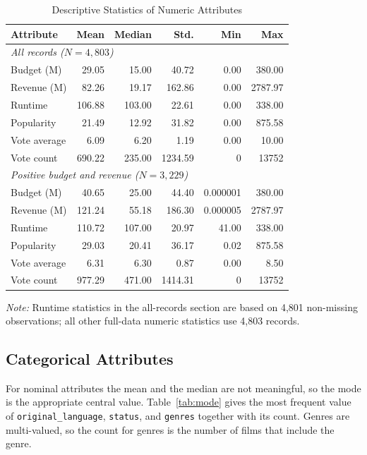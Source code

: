 \documentclass[conference]{IEEEtran}
\begin{document}
\begin{table}[t]
\caption{Descriptive Statistics of Numeric Attributes}
\label{tab:numeric}
\centering
\scriptsize
\setlength{\tabcolsep}{3.2pt}
\begin{tabular}{lrrrrr}
\toprule
Attribute & Mean & Median & Std. & Min & Max \\
\midrule
\multicolumn{6}{l}{\emph{All records ($N=4{,}803$)}}\\
Budget (M) & 29.05 & 15.00 & 40.72 & 0.00 & 380.00 \\
Revenue (M) & 82.26 & 19.17 & 162.86 & 0.00 & 2787.97 \\
Runtime & 106.88 & 103.00 & 22.61 & 0.00 & 338.00 \\
Popularity & 21.49 & 12.92 & 31.82 & 0.00 & 875.58 \\
Vote average & 6.09 & 6.20 & 1.19 & 0.00 & 10.00 \\
Vote count & 690.22 & 235.00 & 1234.59 & 0 & 13752 \\
\midrule
\multicolumn{6}{l}{\emph{Positive budget and revenue ($N=3{,}229$)}}\\
Budget (M) & 40.65 & 25.00 & 44.40 & 0.000001 & 380.00 \\
Revenue (M) & 121.24 & 55.18 & 186.30 & 0.000005 & 2787.97 \\
Runtime & 110.72 & 107.00 & 20.97 & 41.00 & 338.00 \\
Popularity & 29.03 & 20.41 & 36.17 & 0.02 & 875.58 \\
Vote average & 6.31 & 6.30 & 0.87 & 0.00 & 8.50 \\
Vote count & 977.29 & 471.00 & 1414.31 & 0 & 13752 \\
\bottomrule
\end{tabular}
\vspace{1mm}
\parbox{0.98\columnwidth}{\scriptsize \textit{Note:} Runtime statistics in the all-records section are based on 4,801 non-missing observations; all other full-data numeric statistics use 4,803 records.}
\end{table}
\subsection{Categorical Attributes}
\label{sec:categorical}
For nominal attributes the mean and the median are not meaningful, so the mode is the appropriate central value. Table~\ref{tab:mode} gives the most frequent value of \texttt{original\_language}, \texttt{status}, and \texttt{genres} together with its count. Genres are multi-valued, so the count for genres is the number of films that include the genre.
\end{document}

